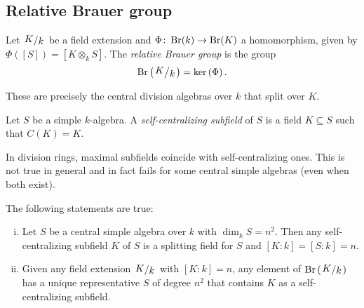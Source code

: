 \newpage

\subsection{Relative Brauer group}

\begin{definicija}
Let $\kvoc{K}{k}$ be a field extension and
$\Phi \colon \operatorname{Br}(k) \to \operatorname{Br}(K)$ a homomorphism, given by
$\Phi([S]) = [K \otimes_k S]$. The
\emph{relative Brauer group} is the
group
\[
\Br \br{\kvoc{K}{k}} = \ker \br{\Phi}.
\]
\end{definicija}

\begin{opomba}
These are precisely the central division algebras over $k$ that
split over $K$.
\end{opomba}

\begin{definicija}
Let $S$ be a simple $k$-algebra. A
\emph{self-centralizing subfield}
of $S$ is a field $K \subseteq S$ such that $C(K) = K$.
\end{definicija}

\begin{opomba}
In division rings, maximal subfields coincide with
self-centralizing ones. This is not true in general and in fact
fails for some central simple algebras (even when both exist).
\end{opomba}

\begin{izrek}
The following statements are true:

\begin{enumerate}[i)]
\item Let $S$ be a central simple algebra over $k$ with
$\dim_k S = n^2$. Then any self-centralizing subfield $K$ of $S$ is
a splitting field for $S$ and $[K : k] = [S : k] = n$.
\item Given any field extension $\kvoc{K}{k}$ with $[K : k] = n$,
any element of $\Br \br{\kvoc{K}{k}}$ has a unique representative
$S$ of degree $n^2$ that contains $K$ as a self-centralizing
subfield.
\end{enumerate}
\end{izrek}


